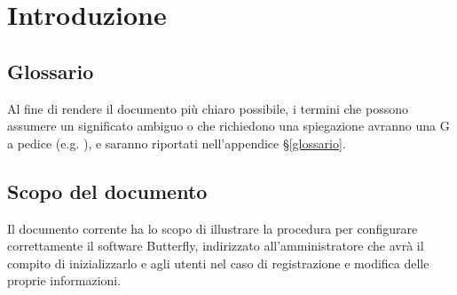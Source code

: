 \section{Introduzione}\label{intro}

% 

\subsection{Glossario}

Al fine di rendere il documento più chiaro possibile, i termini che possono assumere un significato ambiguo o che richiedono una spiegazione avranno
una G a pedice (e.g. ), e saranno riportati nell'appendice \S\ref{glossario}.

\subsection{Scopo del documento}
Il documento corrente ha lo scopo di illustrare la procedura per configurare correttamente il software Butterfly, indirizzato
all'amministratore che avrà il compito di inizializzarlo e agli utenti nel caso di registrazione e modifica delle proprie informazioni.


